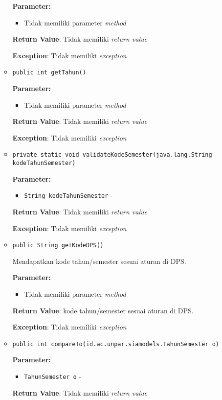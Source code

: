 \documentclass{article}
\begin{document}
\begin{enumerate}
\begin{itemize}
\textbf{Parameter:}
\begin{itemize}
\item Tidak memiliki parameter \textit{method}
\end{itemize}
\textbf{Return Value}: Tidak memiliki \textit{return value}

\textbf{Exception}: Tidak memiliki \textit{exception}

\item \texttt{public int getTahun()}



\textbf{Parameter:}
\begin{itemize}
\item Tidak memiliki parameter \textit{method}
\end{itemize}
\textbf{Return Value}: Tidak memiliki \textit{return value}

\textbf{Exception}: Tidak memiliki \textit{exception}

\item \texttt{private static void validateKodeSemester(java.lang.String kodeTahunSemester)}



\textbf{Parameter:}
\begin{itemize}
\item \texttt{String kodeTahunSemester} - 
\end{itemize}
\textbf{Return Value}: Tidak memiliki \textit{return value}

\textbf{Exception}: Tidak memiliki \textit{exception}

\item \texttt{public String getKodeDPS()}

Mendapatkan kode tahun/semester sesuai aturan di DPS.

\textbf{Parameter:}
\begin{itemize}
\item Tidak memiliki parameter \textit{method}
\end{itemize}
\textbf{Return Value}: kode tahun/semester sesuai aturan di DPS.

\textbf{Exception}: Tidak memiliki \textit{exception}

\item \texttt{public int compareTo(id.ac.unpar.siamodels.TahunSemester o)}



\textbf{Parameter:}
\begin{itemize}
\item \texttt{TahunSemester o} - 
\end{itemize}
\textbf{Return Value}: Tidak memiliki \textit{return value}


\end{itemize}
\end{enumerate}
\end{document}
